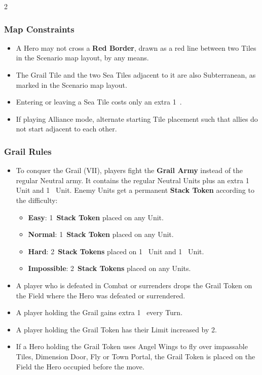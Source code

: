 \begin{multicols}{2}
\subsubsection*{Map Constraints}

\begin{itemize}
  \item A Hero may not cross a \textbf{Red Border}, drawn as a red line between two Tiles in the Scenario map layout, by any means.
  \item The Grail Tile and the two Sea Tiles adjacent to it are also Subterranean, as marked in the Scenario map layout.
  \item Entering or leaving a Sea Tile costs only an extra 1~.
  \item If playing Alliance mode, alternate starting Tile placement such that allies do not start adjacent to each other.
\end{itemize}

\subsubsection*{Grail Rules}

\begin{itemize}
  \item To conquer the Grail (VII), players fight the \textbf{Grail Army} instead of the regular Neutral army.
    It contains the regular Neutral Units plus an extra 1~ Unit and 1~ Unit.
    Enemy Units get a permanent \textbf{Stack Token} according to the difficulty:
    \begin{itemize}
      \item \textbf{Easy}: 1~\textbf{Stack Token} placed on any  Unit.
      \item \textbf{Normal}: 1~\textbf{Stack Token} placed on any  Unit.
      \item \textbf{Hard}: 2~\textbf{Stack Tokens} placed on 1~ Unit and 1~ Unit.
      \item \textbf{Impossible}: 2~\textbf{Stack Tokens} placed on any  Units.
    \end{itemize}
  \item A player who is defeated in Combat or surrenders drops the Grail Token on the Field where the Hero was defeated or surrendered.
  \item A player holding the Grail gains extra 1~ every Turn.
  \item A player holding the Grail Token has their  Limit increased by 2.
  \item If a Hero holding the Grail Token uses Angel Wings to fly over impassable Tiles, Dimension Door, Fly or Town Portal, the Grail Token is placed on the Field the Hero occupied before the move.
\end{itemize}


\end{multicols}
